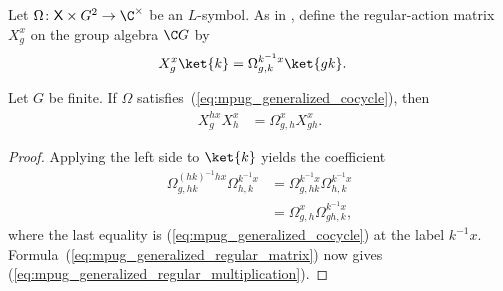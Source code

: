 \begin{definition}
    \label{def:mpug_generalized_regular_matrices}
    \leanok
    Let $\Omega\colon\mathsf X\times G^2\to\C^\times$ be an $L$-symbol.
    As in \cite[Lemma~\texttt{lemma:G\_cocycle}]{FrancoRubio2025MPUGauging},
    define the regular-action matrix $X^x_g$ on the group algebra $\C G$ by
    \begin{align}
        X^x_g\ket{k}
         & =\Omega^{k^{-1}x}_{g,k}\ket{gk}.
        \label{eq:mpug_generalized_regular_matrix}
    \end{align}
\end{definition}

\begin{lemma}
    \label{thm:mpug_generalized_regular_multiplication}
    \leanok
    Let $G$ be finite. If $\Omega$
    satisfies~(\ref{eq:mpug_generalized_cocycle}), then
    \begin{align}
        X^{h x}_gX^x_h
         & =\Omega^x_{g,h}X^x_{gh}.
        \label{eq:mpug_generalized_regular_multiplication}
    \end{align}
\end{lemma}

\begin{proof}\leanok
    Applying the left side to $\ket{k}$ yields the coefficient
    \begin{align}
        \Omega^{(hk)^{-1}h x}_{g,hk}\Omega^{k^{-1}x}_{h,k}
         & =\Omega^{k^{-1}x}_{g,hk}\Omega^{k^{-1}x}_{h,k} \\
         & =\Omega^x_{g,h}\Omega^{k^{-1}x}_{gh,k},
    \end{align}
    where the last equality is
    (\ref{eq:mpug_generalized_cocycle}) at the label $k^{-1}x$.
    Formula~(\ref{eq:mpug_generalized_regular_matrix}) now gives
    (\ref{eq:mpug_generalized_regular_multiplication}).
\end{proof}

